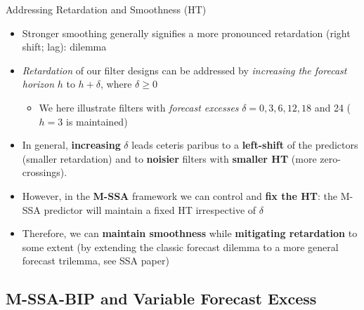 \documentclass{beamer}
\begin{document}
\begin{frame} {Addressing Retardation and Smoothness (HT)}
\begin{itemize}
\item Stronger smoothing generally signifies a more pronounced retardation (right shift; lag): dilemma
\item \emph{Retardation} of our filter designs can be addressed by \emph{increasing the forecast horizon} $h$ to $h+\delta$, where $\delta\geq 0$
\begin{itemize}
\item We here illustrate filters with \emph{forecast excesses} $\delta=0,3,6,12,18$ and 24 ($h=3$ is maintained)
\end{itemize}
\item In general, \textbf{increasing} $\delta$ leads ceteris paribus to a \textbf{left-shift} of the predictors (smaller retardation) and to \textbf{noisier} filters with \textbf{smaller HT} (more zero-crossings). 
\item However, in the \textbf{M-SSA} framework we can control and \textbf{fix the HT}: the M-SSA predictor will maintain a fixed HT irrespective of $\delta$
\item Therefore, we can \textbf{maintain smoothness} while \textbf{mitigating retardation} to some extent (by extending the classic forecast dilemma to a more general forecast trilemma, see SSA paper) 
\end{itemize}

\end{frame}


\subsection{M-SSA-BIP and Variable Forecast Excess}
\end{document}

